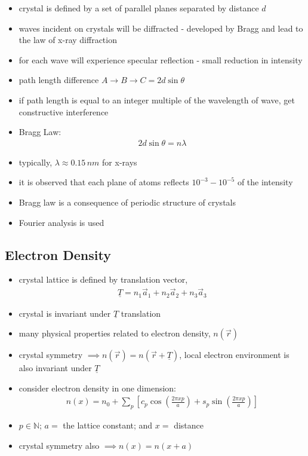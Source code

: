 \documentclass[a4paper,11pt,normalem]{article}
\begin{document}
\begin{itemize}
    \item crystal is defined by a set of parallel planes separated by distance \(d\)
    \item waves incident on crystals will be diffracted - developed by Bragg and lead to the law of x-ray diffraction
    \item for each wave will experience specular reflection - small reduction in intensity
    \item path length difference \(A \to B \to C = 2d\sin\theta\)
    \item if path length is equal to an integer multiple of the wavelength of wave, get constructive interference
    \item Bragg Law:
        \begin{align*}
            2d\sin\theta = n\lambda
        \end{align*}
    \item typically, \(\lambda \approx 0.15\,nm\) for x-rays
    \item it is observed that each plane of atoms reflects \(10^{-3} - 10^{-5}\) of the intensity
    \item Bragg law is a consequence of periodic structure of crystals
    \item Fourier analysis is used
\end{itemize}

\subsection{Electron Density}

\begin{itemize}
    \item crystal lattice is defined by translation vector,
        \begin{align*}
            \underline{T} = n_1\vec{a}_1 + n_2\vec{a}_2 + n_3\vec{a}_3
        \end{align*}
    \item crystal is invariant under \(\underline{T}\) translation
    \item many physical properties related to electron density, \(n(\vec{r})\)
    \item crystal symmetry \(\implies n(\vec{r}) = n(\vec{r} + \underline{T})\), local electron environment is also invariant under \(\underline{T}\)
    \item consider electron density in one dimension:
        \begin{align*}
            n(x) = n_0 + \sum_p \left[c_p\cos\left(\frac{2\pi xp}{a}\right) + s_p\sin\left(\frac{2\pi xp}{a}\right)\right]
        \end{align*}
    \item \(p \in \mathbb{N}\); \(a =\) the lattice constant; and \(x =\) distance
    \item crystal symmetry also \(\implies n(x) = n(x + a)\)
\end{itemize}
\end{document}
